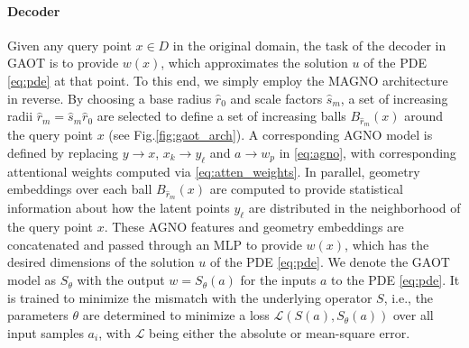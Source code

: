 \documentclass[reqno,10pt]{amsart}
\theoremstyle{plain}
\theoremstyle{definition}
\begin{document}
\paragraph{\bf Decoder} Given any query point $x \in D$ in the original domain, the task of the decoder in GAOT is to provide $w(x)$, which approximates the solution $u$ of the PDE \ref{eq:pde} at that point. To this end, we simply employ the MAGNO architecture in reverse. By choosing a base radius $\hat{r}_0$ and scale factors $\hat{s}_m$, a set of increasing radii $\hat{r}_m = \hat{s}_m \hat{r}_0$ are selected to define a set of increasing balls $B_{\hat{r}_m}(x)$ around the query point $x$ (see Fig.\ref{fig:gaot_arch}). A corresponding AGNO model is defined by replacing $y \rightarrow x$, $x_k \rightarrow y_\ell$ and $a \rightarrow w_p$ in \ref{eq:agno}, with corresponding attentional weights computed via \ref{eq:atten_weights}. In parallel, geometry embeddings over each ball $B_{\hat{r}_m}(x)$ are computed to provide statistical information about how the latent points $y_\ell$ are distributed in the neighborhood of the query point $x$. These AGNO features and geometry embeddings are concatenated and passed through an MLP to provide $w(x)$, which has the desired dimensions of the solution $u$ of the PDE \ref{eq:pde}. We denote the GAOT model as $S_\theta$ with the output $w = S_\theta(a)$ for the inputs $a$ to the PDE \ref{eq:pde}. It is trained to minimize the mismatch with the underlying operator $S$, i.e., the parameters $\theta$ are determined to minimize a loss $\mathcal{L}(S(a), S_\theta(a))$ over all input samples $a_i$, with $\mathcal{L}$ being either the absolute or mean-square error.
\end{document}

